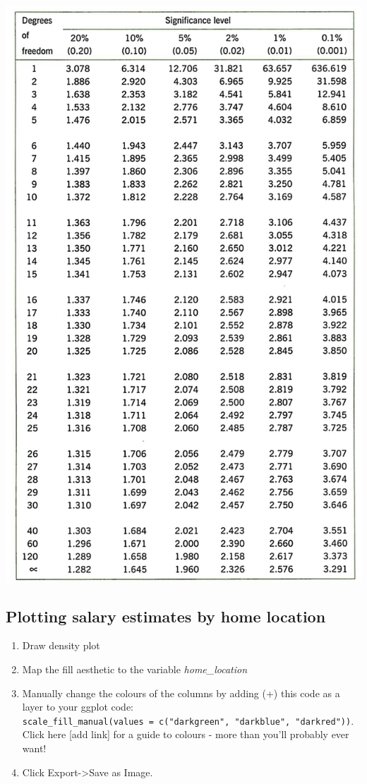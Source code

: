 \documentclass[
]{book}
\begin{document}
\includegraphics{files/Week_7/ttable.png}

\hypertarget{plotting-salary-estimates-by-home-location}{%
\subsection{Plotting salary estimates by home location}\label{plotting-salary-estimates-by-home-location}}

\begin{enumerate}
\def\labelenumi{\arabic{enumi}.}
\setcounter{enumi}{8}
\item
  Draw density plot
\item
  Map the fill aesthetic to the variable \emph{home\_location}
\item
  Manually change the colours of the columns by adding (+) this code as a layer to your ggplot code: \texttt{scale\_fill\_manual(values\ =\ c("darkgreen",\ "darkblue",\ "darkred"))}. Click here {[}add link{]} for a guide to colours - more than you'll probably ever want!
\item
  Click Export-\textgreater Save as Image.
\end{enumerate}
\end{document}
